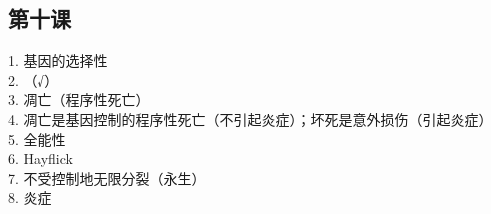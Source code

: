 \documentclass[a4paper,12pt]{ctexart}
\begin{document}
\subsection*{第十课}
1. 基因的选择性\\
2. （√）\\
3. 凋亡（程序性死亡）\\
4. 凋亡是基因控制的程序性死亡（不引起炎症）；坏死是意外损伤（引起炎症）\\
5. 全能性\\
6. Hayflick\\
7. 不受控制地无限分裂（永生）\\
8. 炎症
\end{document}
